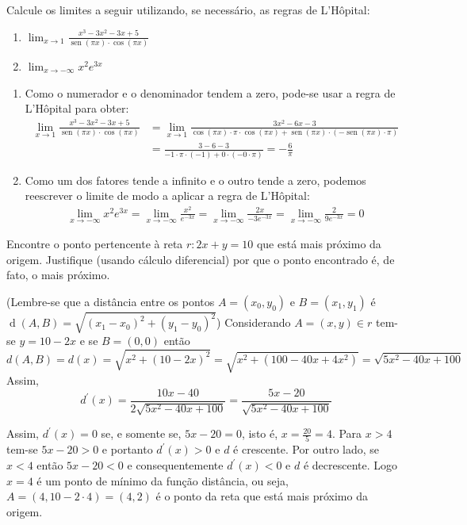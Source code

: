 \documentclass[12pt,a4paper]{article}
\newcommand*\sen{\operatorname{sen}}
\begin{document}
\begin{ExerciseList}
\Exercise[title={2,0}] Calcule os limites a seguir utilizando, se necessário, as regras de L'Hôpital:
\begin{enumerate}
\item $\displaystyle\lim_{x \to 1} \frac{x^3 - 3 x^2 - 3 x + 5}{\sen(\pi x) \cdot \cos(\pi x)}$
\item $\displaystyle\lim_{x \to -\infty} x^2 e^{3x}$
\end{enumerate}
\Answer
\begin{enumerate}
\item Como o numerador e o denominador tendem a zero, pode-se usar a regra de L'Hôpital para obter:
\begin{align*}
\lim_{x \to 1} \frac{x^3 - 3 x^2 - 3 x + 5}
               {\sen(\pi x) \cdot \cos(\pi x)}
& =\lim_{x \to 1} \frac{3x^2 - 6x - 3}
                {\cos(\pi x) \cdot \pi \cdot \cos(\pi x) + \sen(\pi x)\cdot (-\sen(\pi x) \cdot \pi) }\\
& =\frac{3 - 6 - 3}
   {-1 \cdot \pi \cdot (-1) + 0 \cdot (-0 \cdot \pi) }
= -\frac{6}{\pi}
\end{align*}
\item Como um dos fatores tende a infinito e o outro tende a zero, podemos reescrever o limite de modo a aplicar a regra de L'Hôpital:
\begin{align*}
\lim_{x \to -\infty} x^2 e^{3x}
= \lim_{x \to -\infty} \frac{ x^2 }{ e^{-3x} }
= \lim_{x \to -\infty} \frac{ 2x }{ -3e^{-3x} }
= \lim_{x \to -\infty} \frac{ 2 }{ 9e^{-3x} }
= 0
\end{align*}
\end{enumerate}

\Exercise[title={2,0}] Encontre o ponto pertencente à reta $r: 2x + y = 10$ que está mais próximo da origem. Justifique (usando cálculo diferencial) por que o ponto encontrado é, de fato, o mais próximo.

{\footnotesize
(Lembre-se que a distância entre os pontos $A=(x_0,y_0)$ e $B=(x_1,y_1)$ é $\operatorname{d}(A,B) = \sqrt{(x_1-x_0)^2 + (y_1-y_0)^2}$)
}
\Answer Considerando $A = (x, y) \in r$ tem-se $y=10-2x$ e se $B = (0,0)$ então
\[
d(A,B) = d(x)
= \sqrt{x^2 + (10-2x)^2}
= \sqrt{x^2 + (100 -40x + 4x^2)}
= \sqrt{5x^2-40x + 100}
\]
Assim,
\[
d^\prime(x)
= \frac{ 10x - 40 }{2\sqrt{5x^2-40x + 100} }
= \frac{ 5x - 20 }{\sqrt{5x^2-40x + 100} }
\]

Assim, $d^\prime(x) = 0$ se, e somente se, $5x-20 = 0$, isto é, $x=\frac{20}{5} = 4$. Para $x>4$ tem-se $5x-20 > 0$ e portanto $d^\prime(x) > 0$ e $d$ é crescente. Por outro lado, se $x<4$ então $5x-20 < 0$ e consequentemente $d^\prime(x) < 0$ e $d$ é decrescente. Logo $x=4$ é um ponto de mínimo da função distância, ou seja, $A = (4, 10-2\cdot 4) = (4, 2)$ é o ponto da reta que está mais próximo da origem.


\end{ExerciseList}
\end{document}
